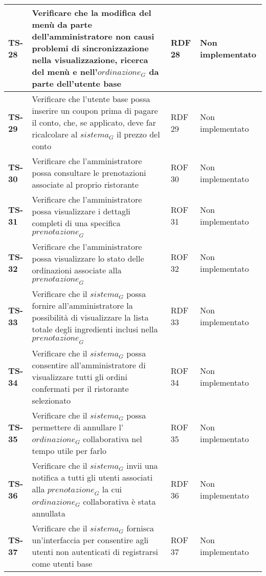 \begin{longtable}{|>{\centering\arraybackslash}p{1.5cm}|p{9.8cm}|p{2cm}|p{3.5cm}|}
    \hline
    \rowcolor{gray!10}
    \textbf{TS-28} & Verificare che la modifica del menù da parte dell'amministratore non causi problemi di sincronizzazione nella visualizzazione, ricerca del menù e nell'$\textit{ordinazione}_G$ da parte dell'utente base & RDF 28 & Non implementato \\ 
    \hline
    \rowcolor{gray!10}
    \textbf{TS-29} & Verificare che l'utente base possa inserire un coupon prima di pagare il conto, che, se applicato, deve far ricalcolare al $\textit{sistema}_G$ il prezzo del conto & RDF 29 & Non implementato \\ 
    \hline
    \rowcolor{gray!10}
    \textbf{TS-30} & Verificare che l'amministratore possa consultare le prenotazioni associate al proprio ristorante & ROF 30 & Non implementato \\ 
    \hline
    \rowcolor{gray!10}
    \textbf{TS-31} & Verificare che l'amministratore possa visualizzare i dettagli completi di una specifica $\textit{prenotazione}_G$ & ROF 31 & Non implementato \\ 
    \hline
    \rowcolor{gray!10}
    \textbf{TS-32} & Verificare che l'amministratore possa visualizzare lo stato delle ordinazioni associate alla $\textit{prenotazione}_G$ & ROF 32 & Non implementato \\ 
    \hline
    \rowcolor{gray!10}
    \textbf{TS-33} & Verificare che il $\textit{sistema}_G$ possa fornire all'amministratore la possibilità di visualizzare la lista totale degli ingredienti inclusi nella $\textit{prenotazione}_G$ & RDF 33 & Non implementato \\ 
    \hline
    \rowcolor{gray!10}
    \textbf{TS-34} & Verificare che il $\textit{sistema}_G$ possa consentire all'amministratore di visualizzare tutti gli ordini confermati per il ristorante selezionato & ROF 34 & Non implementato \\ 
    \hline
    \rowcolor{gray!10}
    \textbf{TS-35} & Verificare che il $\textit{sistema}_G$ possa permettere di annullare l'$\textit{ordinazione}_G$ collaborativa nel tempo utile per farlo & ROF 35 & Non implementato \\
    \hline
    \rowcolor{gray!10}
    \textbf{TS-36} & Verificare che il $\textit{sistema}_G$ invii una notifica a tutti gli utenti associati alla $\textit{prenotazione}_G$ la cui $\textit{ordinazione}_G$ collaborativa è stata annullata & RDF 36 & Non implementato \\ 
    \hline
    \rowcolor{gray!10}
    \textbf{TS-37} & Verificare che il $\textit{sistema}_G$ fornisca un'interfaccia per consentire agli utenti non autenticati di registrarsi come utenti base & ROF 37 & Non implementato \\ 

\end{longtable}
